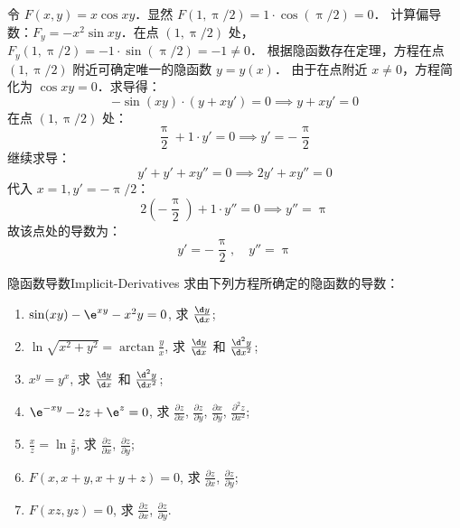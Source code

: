 \begin{solution}
    令 $F(x, y) = x \cos xy$．显然 $F(1, \uppi/2) = 1 \cdot \cos(\uppi/2) = 0$．
    计算偏导数：$F_y = -x^2 \sin xy$．在点 $(1, \uppi/2)$ 处，$F_y(1, \uppi/2) = -1 \cdot \sin(\uppi/2) = -1 \neq 0$．
    根据隐函数存在定理，方程在点 $(1, \uppi/2)$ 附近可确定唯一的隐函数 $y = y(x)$．
    由于在点附近 $x \neq 0$，方程简化为 $\cos xy = 0$．求导得：
    \begin{equation}
        -\sin(xy) \cdot (y + x y') = 0 \implies y + x y' = 0
    \end{equation}
    在点 $(1, \uppi/2)$ 处：
    \begin{equation}
        \frac{\uppi}{2} + 1 \cdot y' = 0 \implies y' = -\frac{\uppi}{2}
    \end{equation}
    继续求导：
    \begin{equation}
        y' + y' + x y'' = 0 \implies 2y' + x y'' = 0
    \end{equation}
    代入 $x=1, y'=-\uppi/2$：
    \begin{equation}
        2\left(-\frac{\uppi}{2}\right) + 1 \cdot y'' = 0 \implies y'' = \uppi
    \end{equation}
    故该点处的导数为：
    \begin{equation}
        \boxed{y' = -\frac{\uppi}{2}, \quad y'' = \uppi}
    \end{equation}
\end{solution}

\begin{problem}{隐函数导数}{Implicit-Derivatives}
    求由下列方程所确定的隐函数的导数：
    \begin{enumerate}
        \item $\sin(xy) - \e^{xy} - x^2 y = 0$, 求 $\frac{\d y}{\d x}$;
        \item $\ln \sqrt{x^2 + y^2} = \arctan \frac{y}{x}$, 求 $\frac{\d y}{\d x}$ 和 $\frac{\d^2 y}{\d x^2}$;
        \item $x^y = y^x$, 求 $\frac{\d y}{\d x}$ 和 $\frac{\d^2 y}{\d x^2}$;
        \item $\e^{-xy} - 2z + \e^z = 0$, 求 $\frac{\partial z}{\partial x}$, $\frac{\partial z}{\partial y}$, $\frac{\partial x}{\partial y}$, $\frac{\partial^2 z}{\partial x^2}$;
        \item $\frac{x}{z} = \ln \frac{z}{y}$, 求 $\frac{\partial z}{\partial x}$, $\frac{\partial z}{\partial y}$;
        \item $F(x, x+y, x+y+z) = 0$, 求 $\frac{\partial z}{\partial x}$, $\frac{\partial z}{\partial y}$;
        \item $F(xz, yz) = 0$, 求 $\frac{\partial z}{\partial x}$, $\frac{\partial z}{\partial y}$.
    \end{enumerate}
\end{problem}

